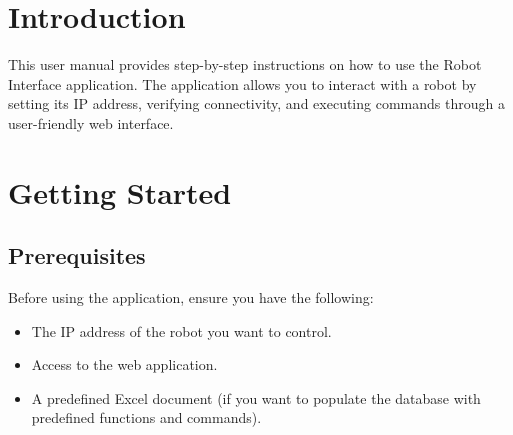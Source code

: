 \documentclass[12pt,a4paper]{scrbook}
\begin{document}
	
	\newpage
	
	
	\tableofcontents
	\clearpage
	
	\listoffigures
	\clearpage
	
	\listoftables
	\clearpage
	
	
	
	
	\section{Introduction}
	This user manual provides step-by-step instructions on how to use the Robot Interface application. The application allows you to interact with a robot by setting its IP address, verifying connectivity, and executing commands through a user-friendly web interface.
	
	\section{Getting Started}
	
	\subsection{Prerequisites}
	Before using the application, ensure you have the following:
	\begin{itemize}
		\item The IP address of the robot you want to control.
		\item Access to the web application.
		\item A predefined Excel document (if you want to populate the database with predefined functions and commands).
	\end{itemize}
	
\end{document}
